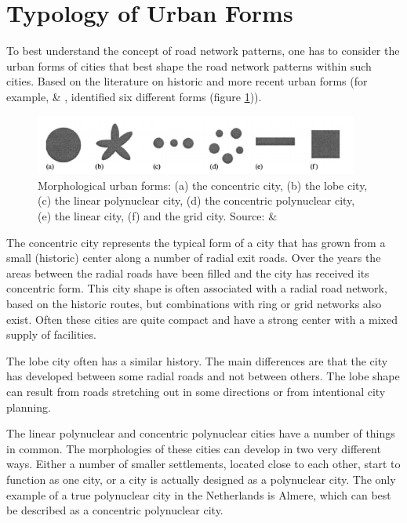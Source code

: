 
\section{Typology of Urban Forms}
To best understand the concept of road network patterns, one has to consider the urban forms of cities that best shape the road network patterns within such cities. Based on the literature on historic and more recent urban forms (for example, \cite{deKlerk:1980} \& \cite{Rottier:1980}, identified six different forms (figure \ref{fig:urban forms})).
\begin{figure}[h]
\centering
\includegraphics[width=0.95\textwidth,center]{picture/figure1.png}
\caption[Morphological Urban Forms]{Morphological urban forms: (a) the concentric city, (b) the lobe city, (c) the linear polynuclear city, (d) the concentric polynuclear city, (e) the linear city, (f) and the grid city.  Source: \cite{deKlerk:1980} \& \cite{Rottier:1980}}
\label{fig:urban forms}
\end{figure}

The concentric city represents the typical form of a city that has grown from a small (historic) center along a number of radial exit roads. Over the years the areas between the radial roads have been filled and the city has received its concentric form. This city shape is often associated with a radial road network, based on the historic routes, but combinations with ring or grid networks also exist. Often these cities are quite compact and have a strong center with a mixed supply of facilities.

The lobe city often has a similar history. The main differences are that the city has developed between some radial roads and not between others. The lobe shape can result from roads stretching out in some directions or from intentional city planning.

The linear polynuclear and concentric polynuclear cities have a number of things in common. The morphologies of these cities can develop in two very different ways. Either a number of smaller settlements, located close to each other, start to function as one city, or a city is actually designed as a polynuclear city. The only example of a true polynuclear city in the Netherlands is Almere, which can best be described as a concentric polynuclear city. 

